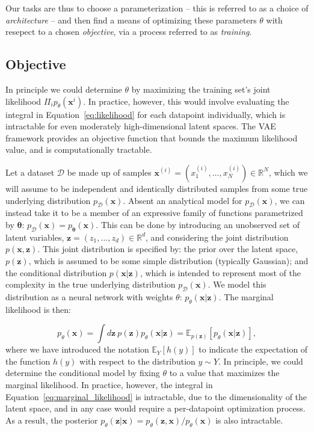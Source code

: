 \documentclass[fleqn,usenatbib]{mnras}
\begin{document}
Our tasks are thus to choose a parameterization -- this is referred to as a choice of \emph{architecture} -- and then find a means of optimizing these parameters $\theta$ with resepect to a chosen \emph{objective}, via a process referred to as \emph{training}.

\subsection{Objective}
\label{sec:objective}

In principle we could determine $\theta$ by maximizing the training set's joint likelihood $\Pi_i p_\theta(\mathbf x^i)$. In practice, however, this would involve evaluating the integral in Equation~\ref{eq:likelihood} for each datapoint individually, which is intractable for even moderately high-dimensional latent spaces. The VAE framework provides an objective function that bounds the maximum likelihood value, and is computationally tractable.

Let a dataset $\mathcal{D}$ be made up of samples $\mathbf{x}^{(i)} = (x_1^{(i)}, \dots, x_N^{(i)}) \in \mathbb{R}^N$, which we will assume to be independent and identically distributed samples from some true underlying distribution $p_{\mathcal{D}}(\mathbf x)$. Absent an analytical model for $p_{\mathcal{D}}(\mathbf x)$, we can instead take it to be a member of an expressive family of functions parametrized by $\bm \theta$: $p_{\mathcal{D}}(\mathbf x) = p_{\bm \theta}(\mathbf{x})$.  This can be done by introducing an unobserved set of latent variables, $\mathbf z = (z_1, \dots, z_d) \in \mathbb{R}^d$, and considering the joint distribution $p(\mathbf x, \mathbf z)$. This joint distribution is specified by: the prior over the latent space, $p(\mathbf z)$, which is assumed to be some simple distribution (typically Gaussian); and the conditional distribution $p(\mathbf x | \mathbf z)$, which is intended to represent most of the complexity in the true underlying distribution $p_{\mathcal{D}}(\mathbf x)$. We model this distribution as a neural network with weights $\theta$: $p_\theta(\mathbf x | \mathbf z)$. The marginal likelihood is then:

\begin{equation}
\label{eq:marginal_likelihood}
    p_\theta(\mathbf{x}) = \int d\mathbf{z}~ p(\mathbf z) p_\theta(\mathbf x | \mathbf z) = 
    \mathbb E_{p(\mathbf z)}\left[ p_\theta(\mathbf x | \mathbf z)\right],
\end{equation}
where we have introduced the notation $\mathbb E_Y[h(y)]$ to indicate the expectation of the function $h(y)$ with respect to the distribution $y \sim Y$. 
In principle, we could determine the conditional model by fixing $\theta$ to a value that maximizes the marginal likelihood. In practice, however, the integral in Equation~\ref{eq:marginal_likelihood} is intractable, due to the dimensionality of the latent space, and in any case would require a per-datapoint optimization process. As a result, the posterior $p_\theta(\mathbf z | \mathbf x) = p_\theta(\mathbf z, \mathbf x) / p_\theta(\mathbf x)$ is also intractable.
\end{document}
